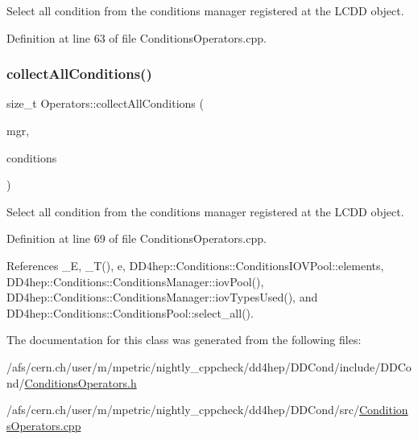 Select all condition from the conditions manager registered at the L\+C\+DD object. 



Definition at line 63 of file Conditions\+Operators.\+cpp.

\hypertarget{class_d_d4hep_1_1_conditions_1_1_operators_a3e62b95a664418388b057e80d20f48b1}{}\label{class_d_d4hep_1_1_conditions_1_1_operators_a3e62b95a664418388b057e80d20f48b1} 
\subsubsection{\texorpdfstring{collect\+All\+Conditions()}{collectAllConditions()}\hspace{0.1cm}{\footnotesize\ttfamily [4/4]}}
{\footnotesize\ttfamily size\+\_\+t Operators\+::collect\+All\+Conditions (\begin{DoxyParamCaption}\item[{\hyperlink{class_d_d4hep_1_1_conditions_1_1_conditions_manager}{Conditions\+Manager}}]{mgr,  }\item[{std\+::map$<$ int, \hyperlink{class_d_d4hep_1_1_conditions_1_1_condition}{Condition} $>$ \&}]{conditions }\end{DoxyParamCaption})\hspace{0.3cm}{\ttfamily [static]}}



Select all condition from the conditions manager registered at the L\+C\+DD object. 



Definition at line 69 of file Conditions\+Operators.\+cpp.



References \+\_\+E, \+\_\+\+T(), e, D\+D4hep\+::\+Conditions\+::\+Conditions\+I\+O\+V\+Pool\+::elements, D\+D4hep\+::\+Conditions\+::\+Conditions\+Manager\+::iov\+Pool(), D\+D4hep\+::\+Conditions\+::\+Conditions\+Manager\+::iov\+Types\+Used(), and D\+D4hep\+::\+Conditions\+::\+Conditions\+Pool\+::select\+\_\+all().



The documentation for this class was generated from the following files\+:\begin{DoxyCompactItemize}
\item 
/afs/cern.\+ch/user/m/mpetric/nightly\+\_\+cppcheck/dd4hep/\+D\+D\+Cond/include/\+D\+D\+Cond/\hyperlink{_conditions_operators_8h}{Conditions\+Operators.\+h}\item 
/afs/cern.\+ch/user/m/mpetric/nightly\+\_\+cppcheck/dd4hep/\+D\+D\+Cond/src/\hyperlink{_conditions_operators_8cpp}{Conditions\+Operators.\+cpp}\end{DoxyCompactItemize}
